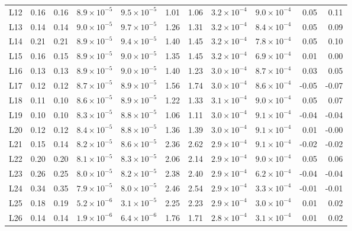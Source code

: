 {\begin{longtable}{@{}lrrrrrrrrrr@{}}
L12 & 0.16 & 0.16 & $8.9{\times}10^{-5}$ & $9.5{\times}10^{-5}$ & 1.01 & 1.06 & $3.2{\times}10^{-4}$ & $9.0{\times}10^{-4}$ & 0.05 & 0.11 \\
L13 & 0.14 & 0.14 & $9.0{\times}10^{-5}$ & $9.7{\times}10^{-5}$ & 1.26 & 1.31 & $3.2{\times}10^{-4}$ & $8.4{\times}10^{-4}$ & 0.05 & 0.09 \\
L14 & 0.21 & 0.21 & $8.9{\times}10^{-5}$ & $9.4{\times}10^{-5}$ & 1.40 & 1.45 & $3.2{\times}10^{-4}$ & $7.8{\times}10^{-4}$ & 0.05 & 0.10 \\
L15 & 0.16 & 0.15 & $8.9{\times}10^{-5}$ & $9.0{\times}10^{-5}$ & 1.35 & 1.45 & $3.2{\times}10^{-4}$ & $6.9{\times}10^{-4}$ & 0.01 & 0.00 \\
L16 & 0.13 & 0.13 & $8.9{\times}10^{-5}$ & $9.0{\times}10^{-5}$ & 1.40 & 1.23 & $3.0{\times}10^{-4}$ & $8.7{\times}10^{-4}$ & 0.03 & 0.05 \\
L17 & 0.12 & 0.12 & $8.7{\times}10^{-5}$ & $8.9{\times}10^{-5}$ & 1.56 & 1.74 & $3.0{\times}10^{-4}$ & $8.6{\times}10^{-4}$ & -0.05 & -0.07 \\
L18 & 0.11 & 0.10 & $8.6{\times}10^{-5}$ & $8.9{\times}10^{-5}$ & 1.22 & 1.33 & $3.1{\times}10^{-4}$ & $9.0{\times}10^{-4}$ & 0.05 & 0.07 \\
L19 & 0.10 & 0.10 & $8.3{\times}10^{-5}$ & $8.8{\times}10^{-5}$ & 1.06 & 1.11 & $3.0{\times}10^{-4}$ & $9.1{\times}10^{-4}$ & -0.04 & -0.04 \\
L20 & 0.12 & 0.12 & $8.4{\times}10^{-5}$ & $8.8{\times}10^{-5}$ & 1.36 & 1.39 & $3.0{\times}10^{-4}$ & $9.1{\times}10^{-4}$ & 0.01 & -0.00 \\
L21 & 0.15 & 0.14 & $8.2{\times}10^{-5}$ & $8.6{\times}10^{-5}$ & 2.36 & 2.62 & $2.9{\times}10^{-4}$ & $9.1{\times}10^{-4}$ & -0.02 & -0.02 \\
L22 & 0.20 & 0.20 & $8.1{\times}10^{-5}$ & $8.3{\times}10^{-5}$ & 2.06 & 2.14 & $2.9{\times}10^{-4}$ & $9.0{\times}10^{-4}$ & 0.05 & 0.06 \\
L23 & 0.26 & 0.25 & $8.0{\times}10^{-5}$ & $8.2{\times}10^{-5}$ & 2.38 & 2.40 & $2.9{\times}10^{-4}$ & $6.2{\times}10^{-4}$ & -0.04 & -0.04 \\
L24 & 0.34 & 0.35 & $7.9{\times}10^{-5}$ & $8.0{\times}10^{-5}$ & 2.46 & 2.54 & $2.9{\times}10^{-4}$ & $3.3{\times}10^{-4}$ & -0.01 & -0.01 \\
L25 & 0.18 & 0.19 & $5.2{\times}10^{-6}$ & $3.1{\times}10^{-5}$ & 2.25 & 2.23 & $2.9{\times}10^{-4}$ & $3.0{\times}10^{-4}$ & 0.01 & 0.02 \\
L26 & 0.14 & 0.14 & $1.9{\times}10^{-6}$ & $6.4{\times}10^{-6}$ & 1.76 & 1.71 & $2.8{\times}10^{-4}$ & $3.1{\times}10^{-4}$ & 0.01 & 0.02 \\

\end{longtable}}
